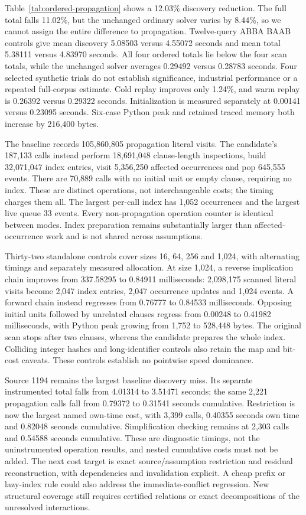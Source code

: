 \documentclass[11pt,a4paper]{article}
\numberwithin{equation}{section}
\theoremstyle{plain}
\theoremstyle{definition}
\theoremstyle{remark}
\begin{document}
Table~\ref{tab:ordered-propagation} shows a 12.03\% discovery reduction. The full total falls 11.02\%, but the unchanged ordinary solver varies by 8.44\%, so we cannot assign the entire difference to propagation. Twelve-query ABBA BAAB controls give mean discovery 5.08503 versus 4.55072 seconds and mean total 5.38111 versus 4.83970 seconds. All four ordered totals lie below the four scan totals, while the unchanged solver averages 0.29492 versus 0.28783 seconds. Four selected synthetic trials do not establish significance, industrial performance or a repeated full-corpus estimate. Cold replay improves only 1.24\%, and warm replay is 0.26392 versus 0.29322 seconds. Initialization is measured separately at 0.00141 versus 0.23095 seconds. Six-case Python peak and retained traced memory both increase by 216,400 bytes.

The baseline records 105,860,805 propagation literal visits. The candidate's 187,133 calls instead perform 18,691,048 clause-length inspections, build 32,071,047 index entries, visit 5,356,250 affected occurrences and pop 645,555 events. There are 70,889 calls with no initial unit or empty clause, requiring no index. These are distinct operations, not interchangeable costs; the timing charges them all. The largest per-call index has 1,052 occurrences and the largest live queue 33 events. Every non-propagation operation counter is identical between modes. Index preparation remains substantially larger than affected-occurrence work and is not shared across assumptions.

Thirty-two standalone controls cover sizes 16, 64, 256 and 1,024, with alternating timings and separately measured allocation. At size 1,024, a reverse implication chain improves from 337.58295 to 0.84911 milliseconds: 2,098,175 scanned literal visits become 2,047 index entries, 2,047 occurrence updates and 1,024 events. A forward chain instead regresses from 0.76777 to 0.84533 milliseconds. Opposing initial units followed by unrelated clauses regress from 0.00248 to 0.41982 milliseconds, with Python peak growing from 1,752 to 528,448 bytes. The original scan stops after two clauses, whereas the candidate prepares the whole index. Colliding integer hashes and long-identifier controls also retain the map and bit-cost caveats. These controls establish no pointwise speed dominance.

Source 1194 remains the largest baseline discovery miss. Its separate instrumented total falls from 4.01314 to 3.51471 seconds; the same 2,221 propagation calls fall from 0.79372 to 0.31541 seconds cumulative. Restriction is now the largest named own-time cost, with 3,399 calls, 0.40355 seconds own time and 0.82048 seconds cumulative. Simplification checking remains at 2,303 calls and 0.54588 seconds cumulative. These are diagnostic timings, not the uninstrumented operation results, and nested cumulative costs must not be added. The next cost target is exact source/assumption restriction and residual reconstruction, with dependencies and invalidation explicit. A cheap prefix or lazy-index rule could also address the immediate-conflict regression. New structural coverage still requires certified relations or exact decompositions of the unresolved interactions.
\end{document}

